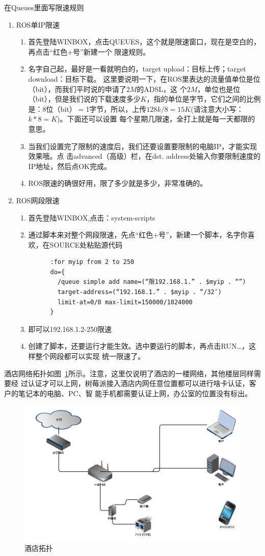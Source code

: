 在Queues里面写限速规则
\begin{enumerate}
\item ROS单IP限速
  \begin{enumerate}
  \item 首先登陆WINBOX，点击QUEUES，这个就是限速窗口，现在是空白的，再点击“红色+号”新建一个
    限速规则。
  \item 名字自己起，最好是一看就明白的，target upload：目标上传；target download：目标下载。
    这里要说明一下，在ROS里表达的流量值单位是位（bit），而我们平时说的申请了$2M$的ADSL，这
    个$2M$，单位也是位（bit），但是我们说的下载速度多少$K$，指的单位是字节，它们之间的比例
    是：8位（bit）$=$1字节，所以，上传$128k/8=15K$(请注意大小写：$k*8=K$)。下面还可以设置
    每个星期几限速，全打上就是每一天都限的意思。
  \item 当我们设置完了限制的速度后，我们还要设置要限制的电脑IP，才能实现效果哦。点
    击advanced（高级）栏，在dst. address处输入你要限制速度的IP地址，然后点OK完成。
  \item ROS限速的确很好用，限了多少就是多少，非常准确的。
  \end{enumerate}
\item ROS网段限速
  \begin{enumerate}
  \item 首先登陆WINBOX,点击：system-scripts
  \item 通过脚本来对整个网段限速，先点“红色+号”，新建一个脚本，名字你喜欢，在SOURCE处粘贴源代码   
    \begin{verbatim}
      :for myip from 2 to 250
      do={
        /queue simple add name=(“限192.168.1.” . $myip . “”)
        target-address=(“192.168.1.” . $myip . “/32″)
        limit-at=0/0 max-limit=150000/1024000
      }
    \end{verbatim}
  \item 即可以192.168.1.2-250限速
  \item 创建了脚本，还要运行才能生效。选中要运行的脚本，再点击RUN…，这样整个网段都可以实现
    统一限速了。
  \end{enumerate}
\end{enumerate}

酒店网络拓扑如图~\ref{fig:hotel}所示。注意，这里仅说明了酒店的一楼网络，其他楼层同样需要经
过认证才可以上网，树莓派接入酒店内网任意位置都可以进行啥卡认证，客户的笔记本的电脑、PC、智
能手机都需要认证上网，办公室的位置没有标出。

\begin{figure}
  \centering
  \includegraphics[width=.9\textwidth]{pic/hotel.png}
  \caption{酒店拓扑}
  \label{fig:hotel}
\end{figure}

